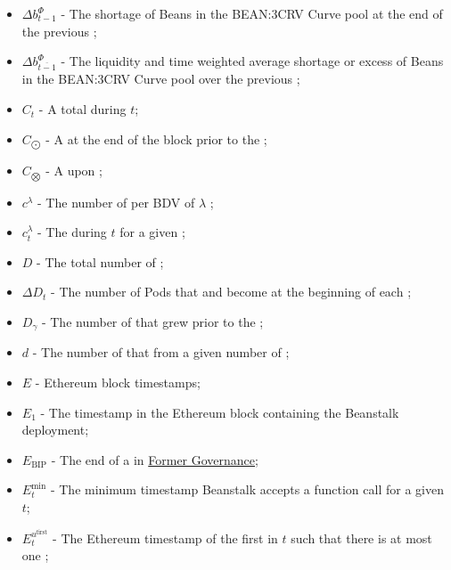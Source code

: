 \documentclass[class=article, crop=false]{standalone}
\begin{document}
\begin{itemize}[topsep=0pt, itemsep=3pt,leftmargin=16pt]
    \item[] $\Delta b_{t-1}^{\Phi}$ - \hypertarget{ht51}{The shortage of Beans in the BEAN:3CRV Curve pool at the end of the previous };
    \item[] $\Delta b_{\overline{t-1}}^{\Phi}$ - \hypertarget{ht52}{The liquidity and time weighted average shortage or excess of Beans in the BEAN:3CRV Curve pool over the previous };
    \item[] $C_t$ - \hypertarget{ht29}{A  total  during $t$};
    \item[] $C_{\bigodot}$ - \hypertarget{ht30}{A   at the end of the block prior to the };
    \item[] $C_{\bigotimes}$ - \hypertarget{ht31}{A   upon };
    \item[] $c^{\lambda}$ - \hypertarget{ht32}{The number of  per BDV of $\lambda$ };
    \item[] $c_{t}^{\lambda}$ - \hypertarget{ht33}{The  during $t$ for a given };
    \item[] $D$ - \hypertarget{ht38}{The total number of };
    \item[] $\Delta D_t$ - \hypertarget{ht53}{The number of Pods that  and become  at the beginning of each };
    \item[] $D_{\gamma}$ - \hypertarget{ht39}{The number of  that grew prior to the };
    \item[] $d$ - \hypertarget{ht40}{The number of  that  from a given number of  \Bean};
    \item[] $E$ - \hypertarget{ht69}{Ethereum block timestamps};
    \item[] $E_1$ - \hypertarget{ht70}{The timestamp in the Ethereum block containing the Beanstalk deployment};
    \item[] $E_{\text{BIP}}$ - \hypertarget{ht71}{The end of a   in \hyperlink{subsection.14.3}{Former Governance}};
    \item[] $E_{t}^{\text{min}}$ - \hypertarget{ht75}{The minimum timestamp Beanstalk accepts a  function call for a given $t$};
    \item[] $E_{t}^{u^{\text{first}}}$ - \hypertarget{ht76}{The Ethereum timestamp of the first  in $t$ such that there is at most one };

\end{itemize}
\end{document}
